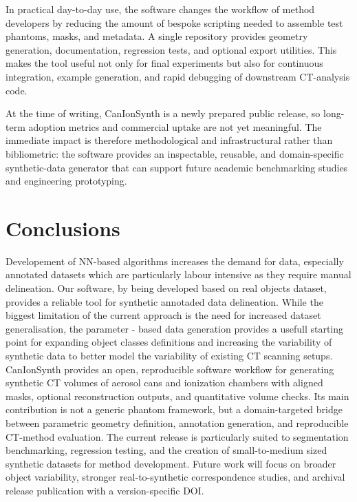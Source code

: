 \documentclass[preprint,12pt, a4paper]{elsarticle}
\begin{document}
In practical day-to-day use, the software changes the workflow of method developers by reducing the amount of bespoke scripting needed to assemble test phantoms, masks, and metadata. A single repository provides geometry generation, documentation, regression tests, and optional export utilities. This makes the tool useful not only for final experiments but also for continuous integration, example generation, and rapid debugging of downstream CT-analysis code.

At the time of writing, CanIonSynth is a newly prepared public release, so long-term adoption metrics and commercial uptake are not yet meaningful. The immediate impact is therefore methodological and infrastructural rather than bibliometric: the software provides an inspectable, reusable, and domain-specific synthetic-data generator that can support future academic benchmarking studies and engineering prototyping.


\section{Conclusions}
Developement of NN-based algorithms increases the demand for data, especially annotated datasets which are particularly labour intensive as they require manual delineation. Our software, by being developed based on real objects dataset, provides a reliable tool for synthetic annotaded data delineation. While the biggest limitation of the current approach is the need for increased dataset generalisation, the parameter - based data generation provides a usefull starting point for expanding object classes definitions and increasing the variability of synthetic data to better model the variability of existing CT scanning setups.
CanIonSynth provides an open, reproducible software workflow for generating synthetic CT volumes of aerosol cans and ionization chambers with aligned masks, optional reconstruction outputs, and quantitative volume checks. Its main contribution is not a generic phantom framework, but a domain-targeted bridge between parametric geometry definition, annotation generation, and reproducible CT-method evaluation. The current release is particularly suited to segmentation benchmarking, regression testing, and the creation of small-to-medium sized synthetic datasets for method development. Future work will focus on broader object variability, stronger real-to-synthetic correspondence studies, and archival release publication with a version-specific DOI.
\end{document}
